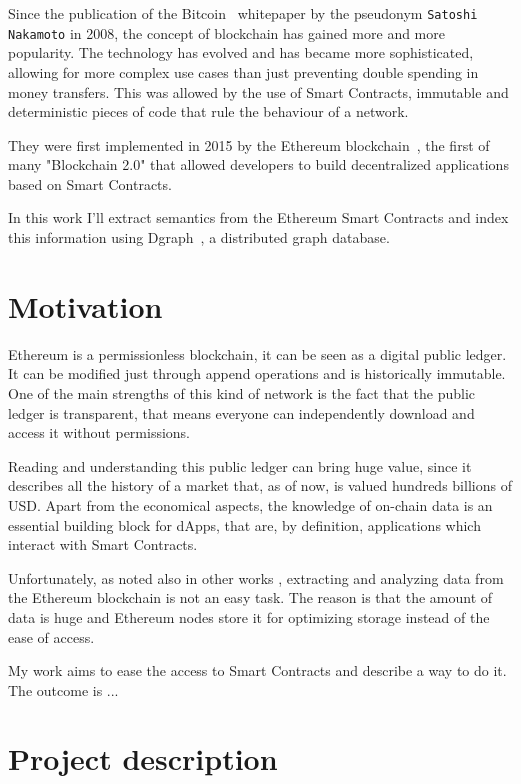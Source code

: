 
Since the publication of the Bitcoin~\cite{bitcoin} whitepaper by the pseudonym {\tt Satoshi Nakamoto} in 2008, the concept of blockchain has gained more and more popularity. The technology has evolved and has became more sophisticated, allowing for more complex use cases than just preventing double spending in money transfers. This was allowed by the use of Smart Contracts, immutable and deterministic pieces of code that rule the behaviour of a network.

\noindent They were first implemented in 2015 by the Ethereum blockchain~\cite{Ethereum}, the first of many "Blockchain 2.0" that allowed developers to build decentralized applications based on Smart Contracts. 

\noindent In this work I'll extract semantics from the Ethereum Smart Contracts and index this information using Dgraph~\cite{dgraph}, a distributed graph database.

\section{Motivation}

Ethereum is a permissionless blockchain, it can be seen as a digital public ledger. It can be modified just through append operations and is historically immutable. One of the main strengths of this kind of network is the fact that the public ledger is transparent, that means everyone can independently download and access it without permissions.

\noindent Reading and understanding this public ledger can bring huge value, since it describes all the history of a market that, as of now, is valued hundreds billions of USD. Apart from the economical aspects, the knowledge of on-chain data is an essential building block for dApps, that are, by definition, applications which interact with Smart Contracts.

\noindent Unfortunately, as noted also in other works \cite{dataether} \cite{xblock-eth} \cite{ethereum_query_language}, extracting and analyzing data from the Ethereum blockchain is not an easy task. The reason is that the amount of data is huge and Ethereum nodes store it for optimizing storage instead of the ease of access.

\noindent My work aims to ease the access to Smart Contracts and describe a way to do it. The outcome is ...


\section{Project description}

